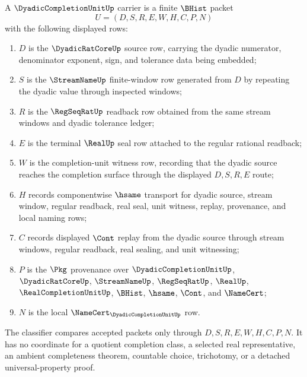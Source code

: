 \begin{definition}
\label{def:dyadic-completion-unit-carrier}
A $\DyadicCompletionUnitUp$ carrier is a finite $\BHist$ packet
$$
U=(D,S,R,E,W,H,C,P,N)
$$
with the following displayed rows:
\begin{enumerate}
\item $D$ is the $\DyadicRatCoreUp$ source row, carrying the dyadic numerator, denominator exponent, sign, and tolerance data being embedded;
\item $S$ is the $\StreamNameUp$ finite-window row generated from $D$ by repeating the dyadic value through inspected windows;
\item $R$ is the $\RegSeqRatUp$ readback row obtained from the same stream windows and dyadic tolerance ledger;
\item $E$ is the terminal $\RealUp$ seal row attached to the regular rational readback;
\item $W$ is the completion-unit witness row, recording that the dyadic source reaches the completion surface through the displayed $D,S,R,E$ route;
\item $H$ records componentwise $\hsame$ transport for dyadic source, stream window, regular readback, real seal, unit witness, replay, provenance, and local naming rows;
\item $C$ records displayed $\Cont$ replay from the dyadic source through stream windows, regular readback, real sealing, and unit witnessing;
\item $P$ is the $\Pkg$ provenance over $\DyadicCompletionUnitUp$, $\DyadicRatCoreUp$, $\StreamNameUp$, $\RegSeqRatUp$, $\RealUp$, $\RealCompletionUnitUp$, $\BHist$, $\hsame$, $\Cont$, and $\NameCert$;
\item $N$ is the local $\NameCert_{\DyadicCompletionUnitUp}$ row.
\end{enumerate}
The classifier compares accepted packets only through $D,S,R,E,W,H,C,P,N$. It has no coordinate for a quotient completion class, a selected real representative, an ambient completeness theorem, countable choice, trichotomy, or a detached universal-property proof.
\end{definition}

